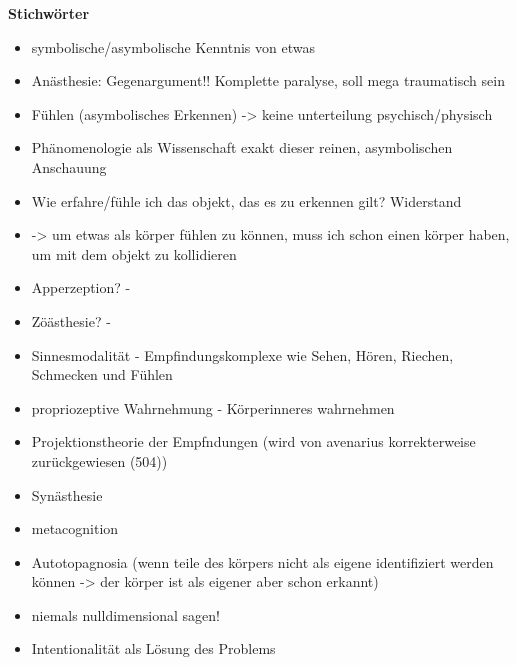 \documentclass[a4paper, 12pt]{article}
\begin{document}
\begin{onehalfspace}
\vspace{5mm}
\noindent\textbf{Stichwörter}
\begin{itemize}
  \item symbolische/asymbolische Kenntnis von etwas
  \item Anästhesie: Gegenargument!! Komplette paralyse, soll mega traumatisch sein
  \item Fühlen (asymbolisches Erkennen) -> keine unterteilung psychisch/physisch
  \item Phänomenologie als Wissenschaft exakt dieser reinen, asymbolischen Anschauung
  \item Wie erfahre/fühle ich das objekt, das es zu erkennen gilt? Widerstand
  \item -> um etwas als körper fühlen zu können, muss ich schon einen körper haben, um mit dem objekt zu kollidieren 
  \item Apperzeption? - 
  \item Zöästhesie? - 
  \item Sinnesmodalität - Empfindungskomplexe wie Sehen, Hören, Riechen, Schmecken und Fühlen
  \item propriozeptive Wahrnehmung - Körperinneres wahrnehmen
  \item Projektionstheorie der Empfndungen (wird von avenarius korrekterweise zurückgewiesen (504))
  \item Synästhesie
  \item metacognition
  \item Autotopagnosia (wenn teile des körpers nicht als eigene identifiziert werden können -> der körper ist als eigener aber schon erkannt)
  \item niemals nulldimensional sagen!
  \item Intentionalität als Lösung des Problems
\end{itemize}







\end{onehalfspace}
\end{document}
